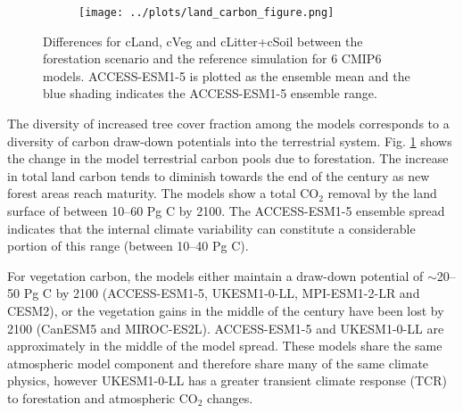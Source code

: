 \documentclass[]{article}
\begin{document}
\begin{figure}[H]
    \centering
    \begin{subfigure}[b]{0.6\linewidth}
        \texttt{[image: ../plots/land\_carbon\_figure.png]}
    \end{subfigure}
    \caption{Differences for cLand, cVeg and cLitter+cSoil between the forestation scenario and the reference simulation for 6 CMIP6 models. ACCESS-ESM1-5 is plotted as the ensemble mean and the blue shading indicates the ACCESS-ESM1-5 ensemble range.}
    \label{fig:models_cpools}
\end{figure}

The diversity of increased tree cover fraction among the models corresponds to a diversity of carbon draw-down potentials into the terrestrial system.
Fig. \ref{fig:models_cpools} shows the change in the model terrestrial carbon pools due to forestation.
The increase in total land carbon tends to diminish towards the end of the century as new forest areas reach maturity.
The models show a total CO$_2$ removal by the land surface of between 10--60 Pg C by 2100.
The ACCESS-ESM1-5 ensemble spread indicates that the internal climate variability can constitute a considerable portion of this range (between 10--40 Pg C).

For vegetation carbon, the models either maintain a draw-down potential of $\sim$20--50 Pg C by 2100 (ACCESS-ESM1-5, UKESM1-0-LL, MPI-ESM1-2-LR and CESM2), or the vegetation gains in the middle of the century have been lost by 2100 (CanESM5 and MIROC-ES2L).
ACCESS-ESM1-5 and UKESM1-0-LL are approximately in the middle of the model spread.
These models share the same atmospheric model component and therefore share many of the same climate physics, however UKESM1-0-LL has a greater transient climate response (TCR) to forestation and atmospheric CO$_2$ changes.
\end{document}
